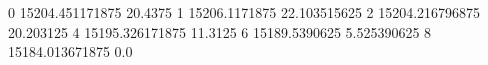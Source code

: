 0 15204.451171875 20.4375
1 15206.1171875 22.103515625
2 15204.216796875 20.203125
4 15195.326171875 11.3125
6 15189.5390625 5.525390625
8 15184.013671875 0.0
